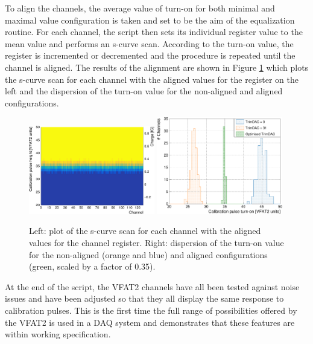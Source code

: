       To align the channels, the average value of turn-on for both minimal and maximal value configuration is taken and set to be the aim of the equalization routine. For each channel, the script then sets its individual register value to the mean value and performs an s-curve scan. According to the turn-on value, the register is incremented or decremented and the procedure is repeated until the channel is aligned. The results of the alignment are shown in Figure \ref{fig:II-5-trimed} which plots the s-curve scan for each channel with the aligned values for the register on the left and the dispersion of the turn-on value for the non-aligned and aligned configurations. \\

      \begin{figure}[h!]
        \centering
        \includegraphics[width=0.49\textwidth]{img/plots/cSCurve_ChannelVCal_Trimed-crop}
        \includegraphics[width=0.49\textwidth]{img/plots/cSCurve_ChannelVCal_Disp-crop}
        \caption{Left: plot of the s-curve scan for each channel with the aligned values for the channel register. Right: dispersion of the turn-on value for the non-aligned (orange and blue) and aligned configurations (green, scaled by a factor of 0.35).}
        \label{fig:II-5-trimed}
      \end{figure}

      At the end of the script, the VFAT2 channels have all been tested against noise issues and have been adjusted so that they all display the same response to calibration pulses. This is the first time the full range of possibilities offered by the VFAT2 is used in a DAQ system and demonstrates that these features are within working specification.

